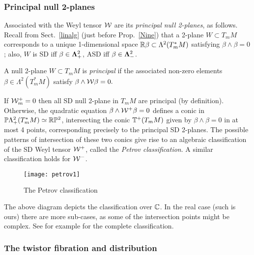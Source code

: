 \subsubsection{Principal null 2-planes} Associated with  the Weyl tensor $\mathcal W$ are  its {\em principal null 2-planes}, as follows. 
Recall  from Sect.~\ref{linalg} (just before Prop.~\ref{Nine}) that a 2-plane $ W\subset T_mM$  corresponds  to  a unique 1-dimensional space $\mathbb{R}\beta\subset \Lambda^2(T^*_mM)$ satisfying $\beta\wedge\beta=0$;  also,   $W$ is SD iff $\beta\in\mathbf{\Lambda}^2_+$, ASD iff $\beta\in\mathbf{\Lambda}^2_-$. 
\begin{definition}\label{def_principal}
A null 2-plane $W\subset  T_mM$  is {\em principal} if the associated  non-zero elements $\beta \in \Lambda^2(T^*_mM)$ satisfy $\beta\wedge\mathcal W\beta=0.$ 

 \end{definition}
%
 If $\mathcal W^+_m=0$ then  all SD null 2-plane in $T_mM$ are principal (by definition). Otherwise, the quadratic equation  $\beta\wedge\mathcal W^+\beta=0$ defines a conic in $\mathbb{P}\Lambda^2_+(T^*_mM)\simeq \mathbb{R}\mathbb{P}^2$, intersecting the conic $\mathbb{T}^+(T_mM)$ given by $\beta\wedge\beta=0$ in at most 4 points, corresponding precisely to  the principal SD 2-planes. The possible patterns of intersection  of these two conics  give rise to an algebraic classification of the SD Weyl tensor $\mathcal W^+$, called the 
 {\em Petrov classification}. A similar classification holds for  $\mathcal W^-$. 
\begin{figure}[h]
\centering
\texttt{[image: petrov1]}
\caption{The Petrov classification}\label{petrov}
\end{figure} 
 
\begin{rmrk} The above diagram depicts the classification over $\mathbb{C}$.  In the real case (such is ours) there are more sub-cases, as some of the intersection points might be complex. See for example \cite{GHN} for the complete classification. 
\end{rmrk} 

\subsubsection{The twistor fibration and distribution}\label{twist}

